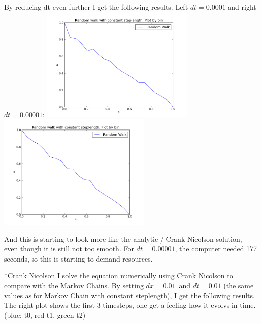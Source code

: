 \documentclass[a4paper, 12pt, titlepage]{article}
\begin{document}
\begin{section}
\begin{subsection}
  By reducing dt even further I get the following results. Left $dt = 0.0001$ and right $dt = 0.00001$:
  \includegraphics[width=0.55\textwidth]{build-main-Desktop-Debug/MC_normal_very_low_dt.png}
  \includegraphics[width=0.55\textwidth]{build-main-Desktop-Debug/MC_normal_very_very_low_dt.png}
  
  And this is starting to look more like the analytic / Crank Nicolson solution, even though it is
  still not too smooth.  For $dt = 0.00001$, the computer needed 177 seconds, so this is starting to demand
  resources. 
  
  \end{subsection}
  \begin{subsection}*{Crank Nicolson}
   I solve the equation numerically using Crank Nicolson to compare with the Markov Chains. By setting 
   $dx = 0.01$ and $dt = 0.01$ (the same values as for Markov Chain with constant steplength), I get the
   following results. The right plot shows the first 3 timesteps, one get a feeling how it evolvs in time. 
   (blue: t0, red t1, green t2)
   

\end{subsection}
\end{section}
\end{document}
